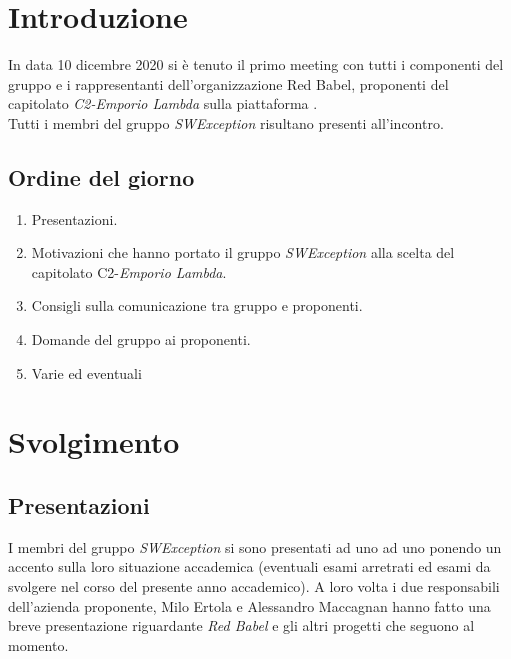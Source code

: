 \section{Introduzione}
In data 10 dicembre 2020 si è tenuto il primo meeting con tutti i componenti del gruppo e i rappresentanti dell'organizzazione Red Babel, proponenti del capitolato \textit{C2-Emporio Lambda} sulla piattaforma . \\
Tutti i membri del gruppo \textit{SWException} risultano presenti all'incontro.

\subsection{Ordine del giorno}
\begin{enumerate}
    \item Presentazioni.
    \item Motivazioni che hanno portato il gruppo \textit{SWException} alla scelta del capitolato C2-\textit{Emporio Lambda}.
    \item Consigli sulla comunicazione tra gruppo e proponenti.
    \item Domande del gruppo ai proponenti.
    \item Varie ed eventuali
\end{enumerate}

\section{Svolgimento}

\subsection{Presentazioni}
I membri del gruppo \textit{SWException} si sono presentati ad uno ad uno ponendo un accento sulla loro situazione accademica (eventuali esami arretrati ed esami da svolgere nel corso del presente anno accademico). A loro volta i due responsabili dell'azienda proponente, Milo Ertola e Alessandro Maccagnan hanno fatto una breve presentazione riguardante \emph{Red Babel} e gli altri progetti che seguono al momento.

